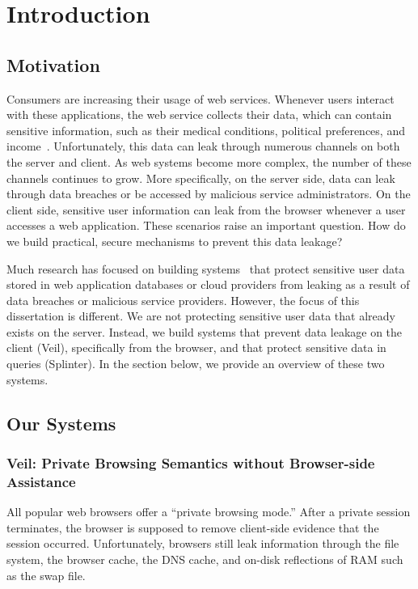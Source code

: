 \section{Introduction}
\label{chap:intro}

\subsection{Motivation}
Consumers are increasing their usage of web services. Whenever
users interact with these applications, the web service collects
their data, which can contain sensitive 
information, such as their medical conditions,
political preferences, and income~\cite{narayanan2010myths, narayanan2008robust}.
Unfortunately, this data can 
leak through numerous channels on both the server
and client. As web systems become more complex, the 
number of these channels continues to grow. More specifically,
on the server side, data can leak through data breaches
or be accessed by malicious service administrators. On the client side,
sensitive user information can leak from the browser whenever
a user accesses a web application. These scenarios raise an important
question. How do we build practical, secure
mechanisms to prevent this data leakage?

Much research has focused on building systems~\cite{popa:mylar, popa:cryptdb, li:sundr, feldman:sporc} 
that protect sensitive user data stored in web application databases
or cloud providers
from leaking as a result of data breaches or malicious service
providers. However, the focus of
this dissertation is different. We are not protecting sensitive 
user data that already exists on the server.
Instead, we build systems
that prevent data leakage on the client (Veil), specifically
from the browser, and that protect sensitive data in queries (Splinter).
In the section below, we provide an overview of these two systems.

\subsection{Our Systems}

\subsubsection{Veil: Private Browsing Semantics without Browser-side Assistance}
All popular web browsers offer a ``private browsing
mode.'' After a private session terminates, the
browser is supposed to remove client-side
evidence that the session occurred. Unfortunately,
browsers still leak information through the file
system, the browser cache, the DNS cache, and
on-disk reflections of RAM such as the swap file.

